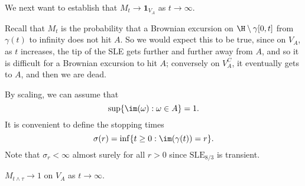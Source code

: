 \documentclass[a4paper]{article}
\newcommand\SLE{\mathrm{SLE}}
\begin{document}
We next want to establish that $M_t \to \mathbf{1}_{V_A}$ as $t \to \infty$.

Recall that $M_t$ is the probability that a Brownian excursion on $\H \setminus \gamma[0, t]$ from $\gamma(t)$ to infinity does not hit $A$. So we would expect this to be true, since on $V_A$, as $t$ increases, the tip of the SLE gets further and further away from $A$, and so it is difficult for a Brownian excursion to hit $A$; conversely on $V_A^C$, it eventually gets to $A$, and then we are dead.

By scaling, we can assume that
\[
  \sup \{\im(\omega): \omega \in A\} = 1.
\]
It is convenient to define the stopping times
\[
  \sigma(r) = \inf \{t \geq 0 : \im(\gamma(t)) = r\}.
\]
Note that $\sigma_r < \infty$ almost surely for all $r > 0$ since $\SLE_{8/3}$ is transient.

\begin{lemma}
  $M_{t \wedge \tau} \to 1$ on $V_A$ as $t \to \infty$.
\end{lemma}
\end{document}
